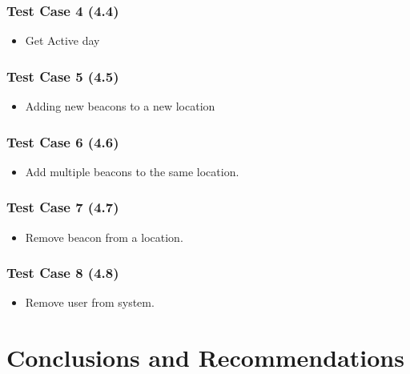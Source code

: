 \documentclass[11pt]{article}
\begin{document}
\subsubsection{Test Case 4 (4.4)}
\begin{itemize}
	\item Get Active day
\end{itemize}

\subsubsection{Test Case 5 (4.5)}
\begin{itemize}
	\item Adding new beacons to a new location
\end{itemize}

\subsubsection{Test Case 6 (4.6)}
\begin{itemize}
	\item Add multiple beacons to the same location.
\end{itemize}

\subsubsection{Test Case 7 (4.7)}
\begin{itemize}
	\item Remove beacon from a location.
\end{itemize}
\subsubsection{Test Case 8 (4.8)}
\begin{itemize}
	\item Remove user from system.
\end{itemize}

\section{Conclusions and Recommendations}
\end{document}
